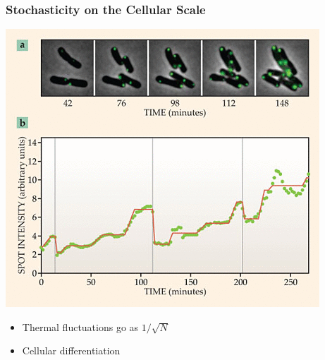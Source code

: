 \documentclass[xcolor={usenames,dvipsnames,svgnames},url=hyphens]{beamer}
\begin{document}
\begin{frame}
    \frametitle{Stochasticity on the Cellular Scale}

    \begin{center}
        \includegraphics[height=0.6\textheight]{cell-stochasticity.png} \footnotesize{\cite{decision-making}}
    \end{center}

    \begin{itemize}
        \item Thermal fluctuations go as $1/\sqrt{N}$
        \item Cellular differentiation
    \end{itemize}
\end{frame}
\end{document}
